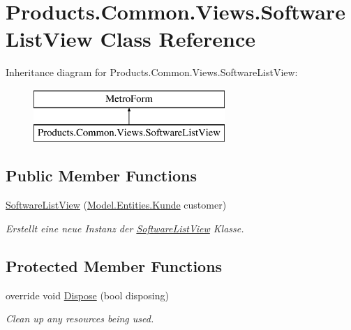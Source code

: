 \hypertarget{class_products_1_1_common_1_1_views_1_1_software_list_view}{}\section{Products.\+Common.\+Views.\+Software\+List\+View Class Reference}
\label{class_products_1_1_common_1_1_views_1_1_software_list_view}
Inheritance diagram for Products.\+Common.\+Views.\+Software\+List\+View\+:\begin{figure}[H]
\begin{center}
\leavevmode
\includegraphics[height=2.000000cm]{class_products_1_1_common_1_1_views_1_1_software_list_view}
\end{center}
\end{figure}
\subsection*{Public Member Functions}
\begin{DoxyCompactItemize}
\item 
\hyperlink{class_products_1_1_common_1_1_views_1_1_software_list_view_a789a0d8345ce8b20ba32adf16d87e14e}{Software\+List\+View} (\hyperlink{class_products_1_1_model_1_1_entities_1_1_kunde}{Model.\+Entities.\+Kunde} customer)
\begin{DoxyCompactList}\small\item\em Erstellt eine neue Instanz der \hyperlink{class_products_1_1_common_1_1_views_1_1_software_list_view}{Software\+List\+View} Klasse. \end{DoxyCompactList}\end{DoxyCompactItemize}
\subsection*{Protected Member Functions}
\begin{DoxyCompactItemize}
\item 
override void \hyperlink{class_products_1_1_common_1_1_views_1_1_software_list_view_a2d4477da251149c345bb5319f895c6f0}{Dispose} (bool disposing)
\begin{DoxyCompactList}\small\item\em Clean up any resources being used. \end{DoxyCompactList}\end{DoxyCompactItemize}


